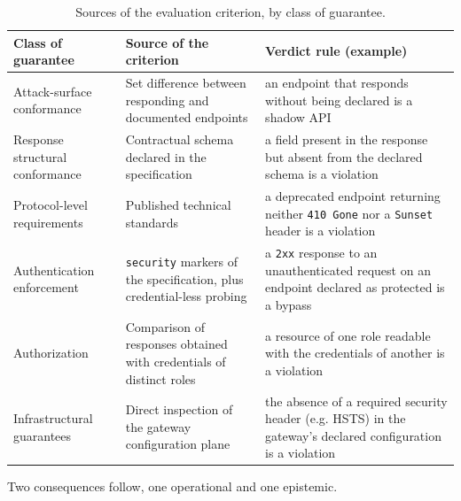 \documentclass[
]{ceurart}
\begin{document}
\begin{table}
  \caption{Sources of the evaluation criterion, by class of guarantee.}
  \label{tab:oracles}
  \begin{tabular}{p{} p{} p{}}
    \toprule
    \textbf{Class of guarantee}     & \textbf{Source of the criterion}                                             & \textbf{Verdict rule (example)}                                                                              \\
    \midrule
    Attack-surface conformance      & Set difference between responding and documented endpoints                   & an endpoint that responds without being declared is a shadow API                                             \\
    Response structural conformance & Contractual schema declared in the specification                             & a field present in the response but absent from the declared schema is a violation                           \\
    Protocol-level requirements     & Published technical standards                                                & a deprecated endpoint returning neither \texttt{410 Gone} nor a \texttt{Sunset} header is a violation        \\
    Authentication enforcement      & \texttt{security} markers of the specification, plus credential-less probing & a \texttt{2xx} response to an unauthenticated request on an endpoint declared as protected is a bypass       \\
    Authorization                   & Comparison of responses obtained with credentials of distinct roles          & a resource of one role readable with the credentials of another is a violation                               \\
    Infrastructural guarantees      & Direct inspection of the gateway configuration plane                         & the absence of a required security header (e.g. HSTS) in the gateway's declared configuration is a violation \\
    \bottomrule
  \end{tabular}
\end{table}

Two consequences follow, one operational and one epistemic.
\end{document}
